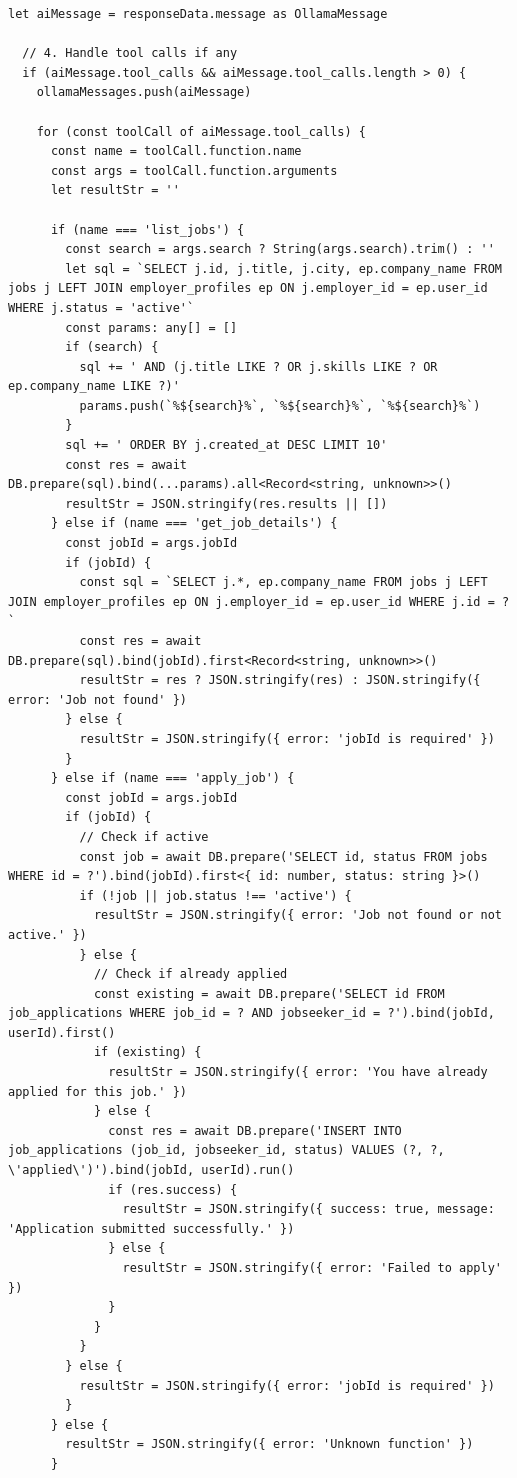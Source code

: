 \documentclass[12pt,a4paper]{report}
\begin{document}
\begin{lstlisting}[caption=Backend AI Job Agent API Route (agent.post.ts)]
  let aiMessage = responseData.message as OllamaMessage

  // 4. Handle tool calls if any
  if (aiMessage.tool_calls && aiMessage.tool_calls.length > 0) {
    ollamaMessages.push(aiMessage)

    for (const toolCall of aiMessage.tool_calls) {
      const name = toolCall.function.name
      const args = toolCall.function.arguments
      let resultStr = ''

      if (name === 'list_jobs') {
        const search = args.search ? String(args.search).trim() : ''
        let sql = `SELECT j.id, j.title, j.city, ep.company_name FROM jobs j LEFT JOIN employer_profiles ep ON j.employer_id = ep.user_id WHERE j.status = 'active'`
        const params: any[] = []
        if (search) {
          sql += ' AND (j.title LIKE ? OR j.skills LIKE ? OR ep.company_name LIKE ?)'
          params.push(`%${search}%`, `%${search}%`, `%${search}%`)
        }
        sql += ' ORDER BY j.created_at DESC LIMIT 10'
        const res = await DB.prepare(sql).bind(...params).all<Record<string, unknown>>()
        resultStr = JSON.stringify(res.results || [])
      } else if (name === 'get_job_details') {
        const jobId = args.jobId
        if (jobId) {
          const sql = `SELECT j.*, ep.company_name FROM jobs j LEFT JOIN employer_profiles ep ON j.employer_id = ep.user_id WHERE j.id = ?`
          const res = await DB.prepare(sql).bind(jobId).first<Record<string, unknown>>()
          resultStr = res ? JSON.stringify(res) : JSON.stringify({ error: 'Job not found' })
        } else {
          resultStr = JSON.stringify({ error: 'jobId is required' })
        }
      } else if (name === 'apply_job') {
        const jobId = args.jobId
        if (jobId) {
          // Check if active
          const job = await DB.prepare('SELECT id, status FROM jobs WHERE id = ?').bind(jobId).first<{ id: number, status: string }>()
          if (!job || job.status !== 'active') {
            resultStr = JSON.stringify({ error: 'Job not found or not active.' })
          } else {
            // Check if already applied
            const existing = await DB.prepare('SELECT id FROM job_applications WHERE job_id = ? AND jobseeker_id = ?').bind(jobId, userId).first()
            if (existing) {
              resultStr = JSON.stringify({ error: 'You have already applied for this job.' })
            } else {
              const res = await DB.prepare('INSERT INTO job_applications (job_id, jobseeker_id, status) VALUES (?, ?, \'applied\')').bind(jobId, userId).run()
              if (res.success) {
                resultStr = JSON.stringify({ success: true, message: 'Application submitted successfully.' })
              } else {
                resultStr = JSON.stringify({ error: 'Failed to apply' })
              }
            }
          }
        } else {
          resultStr = JSON.stringify({ error: 'jobId is required' })
        }
      } else {
        resultStr = JSON.stringify({ error: 'Unknown function' })
      }


\end{lstlisting}
\end{document}
